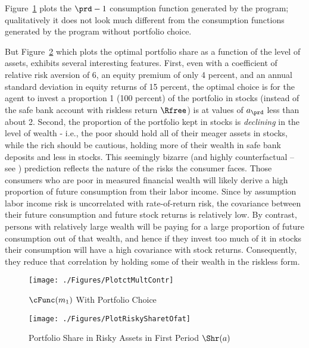 Figure~\ref{fig:PlotctMultContr} plots the $\prd-1$ consumption function generated by the program; qualitatively it does not look much different from the consumption functions generated by the program without portfolio choice.

But Figure~\ref{fig:PlotRiskySharetOfat} which plots the optimal portfolio share as a function of the level of assets, exhibits several interesting features.  First, even with a coefficient of relative risk aversion of 6, an equity premium of only 4 percent, and an annual standard deviation in equity returns of 15 percent, the optimal choice is for the agent to invest a proportion 1 (100 percent) of the portfolio in stocks (instead of the safe bank account with riskless return $\Rfree$) is at values of ${a}_{\prd}$ less than about 2.  Second, the proportion of the portfolio kept in stocks is \textit{declining} in the level of wealth - i.e., the poor should hold all of their meager assets in stocks, while the rich should be cautious, holding more of their wealth in safe bank deposits and less in stocks.  This seemingly bizarre (and highly counterfactual -- see \cite{carroll:richportfolios}) prediction reflects the nature of the risks the consumer faces.  Those consumers who are poor in measured financial wealth will likely derive a high proportion of future consumption from their labor income.  Since by assumption labor income risk is uncorrelated with rate-of-return risk, the covariance between their future consumption and future stock returns is relatively low.  By contrast, persons with relatively large wealth will be paying for a large proportion of future consumption out of that wealth, and hence if they invest too much of it in stocks their consumption will have a high covariance with stock returns.  Consequently, they reduce that correlation by holding some of their wealth in the riskless form.

\hypertarget{PlotctMultContr}{}
\begin{figure}
  \texttt{[image: ./Figures/PlotctMultContr]}
  \caption{$\cFunc({m}_{1})$ With Portfolio Choice}
  \label{fig:PlotctMultContr}
\end{figure}

\hypertarget{PlotRiskySharetOfat}{}
\begin{figure}
  \texttt{[image: ./Figures/PlotRiskySharetOfat]}
  \caption{Portfolio Share in Risky Assets in First Period $\Shr({a})$}
  \label{fig:PlotRiskySharetOfat}
\end{figure}
